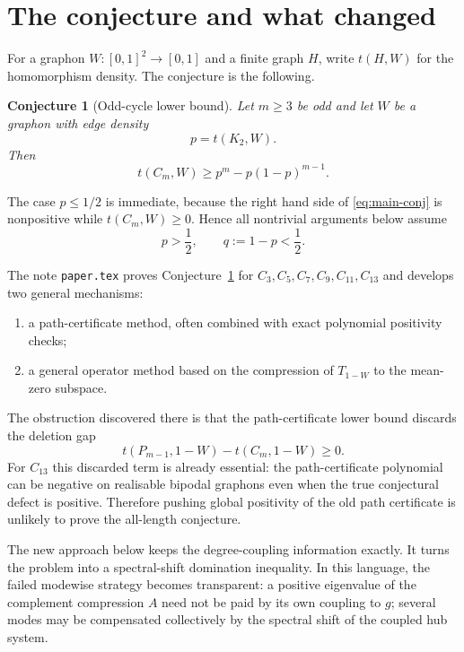 \documentclass[11pt]{article}
\newtheorem{conjecture}[theorem]{Conjecture}
\begin{document}
\tableofcontents

\section{The conjecture and what changed}

For a graphon $W:[0,1]^2\to[0,1]$ and a finite graph $H$, write $t(H,W)$ for the homomorphism density.  The conjecture is the following.

\begin{conjecture}[Odd-cycle lower bound]\label{conj:main}
Let $m\ge3$ be odd and let $W$ be a graphon with edge density
\[
        p=t(K_2,W).
\]
Then
\begin{equation}\label{eq:main-conj}
        t(C_m,W)\ge p^m-p(1-p)^{m-1}.
\end{equation}
\end{conjecture}

The case $p\le1/2$ is immediate, because the right hand side of \eqref{eq:main-conj} is nonpositive while $t(C_m,W)\ge0$.  Hence all nontrivial arguments below assume
\[
        p>\frac12,
        \qquad q:=1-p<\frac12.
\]

The note \texttt{paper.tex} proves Conjecture~\ref{conj:main} for $C_3,C_5,C_7,C_9,C_{11},C_{13}$ and develops two general mechanisms:
\begin{enumerate}[label=\textup{(\roman*)}]
    \item a path-certificate method, often combined with exact polynomial positivity checks;
    \item a general operator method based on the compression of $T_{1-W}$ to the mean-zero subspace.
\end{enumerate}
The obstruction discovered there is that the path-certificate lower bound discards the deletion gap
\[
        t(P_{m-1},1-W)-t(C_m,1-W)\ge0.
\]
For $C_{13}$ this discarded term is already essential: the path-certificate polynomial can be negative on realisable bipodal graphons even when the true conjectural defect is positive.  Therefore pushing global positivity of the old path certificate is unlikely to prove the all-length conjecture.

The new approach below keeps the degree-coupling information exactly.  It turns the problem into a spectral-shift domination inequality.  In this language, the failed modewise strategy becomes transparent: a positive eigenvalue of the complement compression $A$ need not be paid by its own coupling to $g$; several modes may be compensated collectively by the spectral shift of the coupled hub system.
\end{document}
